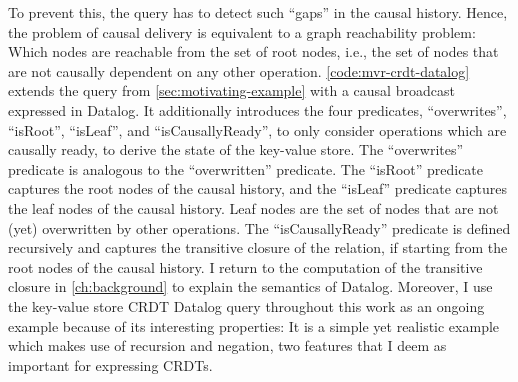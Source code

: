To prevent this, the query has to detect such ``gaps'' in the causal history.
Hence, the problem of causal delivery is equivalent to a graph reachability
problem: Which nodes are reachable from the set of root nodes, i.e., the set of
nodes that are not causally dependent on any other operation.
\ref{code:mvr-crdt-datalog} extends the query from \autoref{sec:motivating-example}
with a causal broadcast expressed in Datalog.
It additionally introduces the four predicates, ``overwrites'', ``isRoot'',
``isLeaf'', and ``isCausallyReady'', to only consider operations
which are causally ready, to derive the state of the key-value store.
The ``overwrites'' predicate is analogous to the ``overwritten'' predicate.
The ``isRoot'' predicate captures the root nodes of the causal history,
and the ``isLeaf'' predicate captures the leaf nodes of the causal history.
Leaf nodes are the set of nodes that are not (yet) overwritten by other operations.
The ``isCausallyReady'' predicate is defined recursively and captures
the transitive closure of the  relation,
if starting from the root nodes of the causal history.
I return to the computation of the transitive closure in \ref{ch:background} to
explain the semantics of Datalog.
Moreover, I use the key-value store \ac{CRDT} Datalog query throughout this work
as an ongoing example because of its interesting properties:
It is a simple yet realistic example which makes use of recursion and negation,
two features that I deem as important for expressing \acp{CRDT}.

